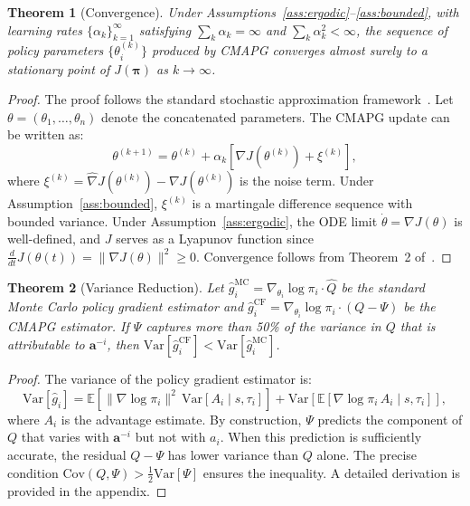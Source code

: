 \documentclass[journal]{IEEEtran}
\newtheorem{theorem}{Theorem}
\newcommand{\EE}{\mathbb{E}}
\begin{document}
\begin{theorem}[Convergence]\label{thm:convergence}
Under Assumptions~\ref{ass:ergodic}--\ref{ass:bounded}, with learning rates $\{\alpha_k\}_{k=1}^{\infty}$ satisfying $\sum_k \alpha_k = \infty$ and $\sum_k \alpha_k^2 < \infty$, the sequence of policy parameters $\{\theta_i^{(k)}\}$ produced by CMAPG converges almost surely to a stationary point of $J(\bm{\pi})$ as $k \to \infty$.
\end{theorem}

\begin{proof}
The proof follows the standard stochastic approximation framework~\cite{borkar2009stochastic}. Let $\theta = (\theta_1, \ldots, \theta_n)$ denote the concatenated parameters. The CMAPG update can be written as:
\begin{equation}
    \theta^{(k+1)} = \theta^{(k)} + \alpha_k\left[\nabla J(\theta^{(k)}) + \xi^{(k)}\right],
\end{equation}
where $\xi^{(k)} = \hat{\nabla} J(\theta^{(k)}) - \nabla J(\theta^{(k)})$ is the noise term. Under Assumption~\ref{ass:bounded}, $\xi^{(k)}$ is a martingale difference sequence with bounded variance. Under Assumption~\ref{ass:ergodic}, the ODE limit $\dot{\theta} = \nabla J(\theta)$ is well-defined, and $J$ serves as a Lyapunov function since $\frac{d}{dt} J(\theta(t)) = \|\nabla J(\theta)\|^2 \geq 0$. Convergence follows from Theorem~2 of~\cite{borkar2009stochastic}.
\end{proof}

\begin{theorem}[Variance Reduction]\label{thm:variance}
Let $\hat{g}_i^{\text{MC}} = \nabla_{\theta_i} \log \pi_i \cdot \hat{Q}$ be the standard Monte Carlo policy gradient estimator and $\hat{g}_i^{\text{CF}} = \nabla_{\theta_i} \log \pi_i \cdot (Q - \Psi)$ be the CMAPG estimator. If $\Psi$ captures more than 50\% of the variance in $Q$ that is attributable to $\mathbf{a}^{-i}$, then $\text{Var}[\hat{g}_i^{\text{CF}}] < \text{Var}[\hat{g}_i^{\text{MC}}]$.
\end{theorem}

\begin{proof}
The variance of the policy gradient estimator is:
\begin{equation}
    \text{Var}[\hat{g}_i] = \EE\left[\|\nabla \log \pi_i\|^2 \, \text{Var}[A_i \mid s, \tau_i]\right] + \text{Var}\left[\EE[\nabla \log \pi_i \, A_i \mid s, \tau_i]\right],
\end{equation}
where $A_i$ is the advantage estimate. By construction, $\Psi$ predicts the component of $Q$ that varies with $\mathbf{a}^{-i}$ but not with $a_i$. When this prediction is sufficiently accurate, the residual $Q - \Psi$ has lower variance than $Q$ alone. The precise condition $\text{Cov}(Q, \Psi) > \frac{1}{2}\text{Var}[\Psi]$ ensures the inequality. A detailed derivation is provided in the appendix.
\end{proof}
\end{document}

